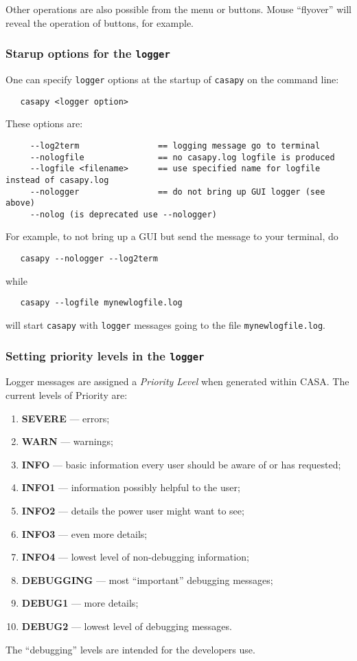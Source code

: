 Other operations are also possible from the menu or buttons.  Mouse
``flyover'' will reveal the operation of buttons, for example.

\subsubsection{Starup options for the {\tt logger}}
\label{section:intro.common.logger.startup}

One can specify {\tt logger} options at the startup of {\tt casapy} on
the command line:
\small
\begin{verbatim}
   casapy <logger option>
\end{verbatim}
\normalsize

These options are:
\small
\begin{verbatim}
     --log2term                == logging message go to terminal
     --nologfile               == no casapy.log logfile is produced
     --logfile <filename>      == use specified name for logfile instead of casapy.log
     --nologger                == do not bring up GUI logger (see above)
     --nolog (is deprecated use --nologger)
\end{verbatim}
\normalsize
For example, to not bring up a GUI but send the message to your
terminal, do
\small
\begin{verbatim}
   casapy --nologger --log2term
\end{verbatim}
\normalsize
while
\small
\begin{verbatim}
   casapy --logfile mynewlogfile.log
\end{verbatim}
\normalsize
will start {\tt casapy} with {\tt logger} messages going to the file
{\tt mynewlogfile.log}.

\subsubsection{Setting priority levels in the {\tt logger}}
\label{section:intro.common.logger.levels}

Logger messages are assigned a {\it Priority Level} when generated
within CASA.  The current levels of Priority are:
\begin{enumerate}
\item {\bf SEVERE} --- errors;
\item {\bf WARN} --- warnings;
\item {\bf INFO} --- basic information every user should be aware of or
  has requested;
\item {\bf INFO1} --- information possibly helpful to the user;
\item {\bf INFO2} --- details the power user might want to see;
\item {\bf INFO3} --- even more details;
\item {\bf INFO4} --- lowest level of non-debugging information;
\item {\bf DEBUGGING} --- most ``important'' debugging messages;
\item {\bf DEBUG1} --- more details;
\item {\bf DEBUG2} --- lowest level of debugging messages.
\end{enumerate}
The ``debugging'' levels are intended for the developers use.

